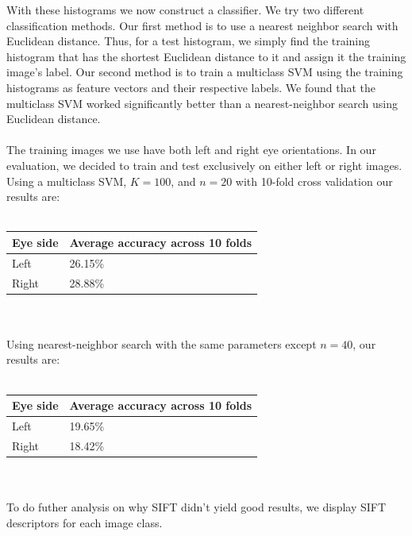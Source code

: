 \documentclass{article} %
\begin{document}
With these histograms we now construct a classifier. We try two different classification methods. Our first method is to use a nearest neighbor search with Euclidean distance. Thus, for a test histogram, we simply find the training histogram that has the shortest Euclidean distance to it and assign it the training image's label. Our second method is to train a multiclass SVM using the training histograms as feature vectors and their respective labels. We found that the multiclass SVM worked significantly better than a nearest-neighbor search using Euclidean distance. \\ \\
The training images we use have both left and right eye orientations. In our evaluation, we decided to train and test exclusively on either left or right images. Using a multiclass SVM, $K=100$, and $n=20$ with 10-fold cross validation our results are: \\ \\
\begin{tabular}{| l | l |}
\hline
Eye side & Average accuracy across 10 folds \\ \hline
Left & 26.15\% \\ \hline
Right & 28.88\% \\ \hline
\end{tabular} \\ \\
Using nearest-neighbor search with the same parameters except $n=40$, our results are: \\ \\
\begin{tabular}{| l | l |}
\hline
Eye side & Average accuracy across 10 folds \\ \hline
Left & 19.65\% \\ \hline
Right & 18.42\% \\ \hline
\end{tabular}  \\ \\
To do futher analysis on why SIFT didn't yield good results, we display SIFT descriptors for each image class. 
\end{document}
